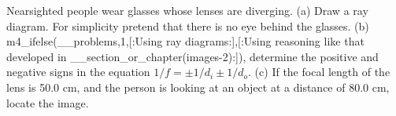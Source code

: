 \answercheck Nearsighted people wear glasses whose lenses are
diverging. (a) Draw a ray diagram. For simplicity pretend
that there is no eye behind the glasses. 
(b) m4_ifelse(__problems,1,[:Using ray diagrams:],[:Using reasoning
like that developed in __section_or_chapter(images-2):]), determine the
positive and negative signs in the equation $1/f=\pm1/d_i\pm1/d_o$. (c) If the
focal length of the lens is 50.0 cm, and the person is
looking at an object at a distance of 80.0 cm, locate the image.
